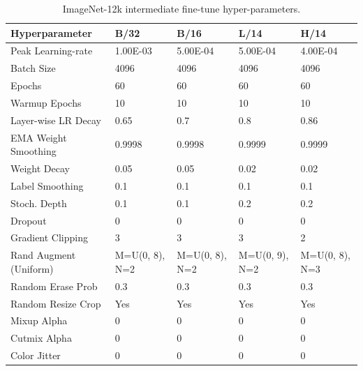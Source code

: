 \begin{appendix}
\begin{table}
\footnotesize
\centering
{}
\begin{tabular}{lllll}
\toprule
        Hyperparameter &           B/32 &           B/16 &           L/14 &           H/14 \\
\midrule
    Peak Learning-rate &       1.00E-03 &       5.00E-04 &       5.00E-04 &       4.00E-04 \\
            Batch Size &           4096 &           4096 &           4096 &           4096 \\
                Epochs &             60 &             60 &             60 &             60 \\
         Warmup Epochs &             10 &             10 &             10 &             10 \\
   Layer-wise LR Decay &           0.65 &            0.7 &            0.8 &           0.86 \\
  EMA Weight Smoothing &         0.9998 &         0.9998 &         0.9999 &         0.9999 \\
          Weight Decay &           0.05 &           0.05 &           0.02 &           0.02 \\
       Label Smoothing &            0.1 &            0.1 &            0.1 &            0.1 \\
          Stoch. Depth &            0.1 &            0.1 &            0.2 &            0.2 \\
               Dropout &              0 &              0 &              0 &              0 \\
     Gradient Clipping &              3 &              3 &              3 &              2 \\
Rand Augment (Uniform) & M=U(0, 8), N=2 & M=U(0, 8), N=2 & M=U(0, 9), N=2 & M=U(0, 8), N=3 \\
     Random Erase Prob &            0.3 &            0.3 &            0.3 &            0.3 \\
    Random Resize Crop &            Yes &            Yes &            Yes &            Yes \\
           Mixup Alpha &              0 &              0 &              0 &              0 \\
          Cutmix Alpha &              0 &              0 &              0 &              0 \\
          Color Jitter &              0 &              0 &              0 &              0 \\
\bottomrule
\end{tabular}
\caption{ImageNet-12k intermediate fine-tune hyper-parameters.}
\label{table:imagenet_ft12k_hparam}
\end{table}



\end{appendix}

